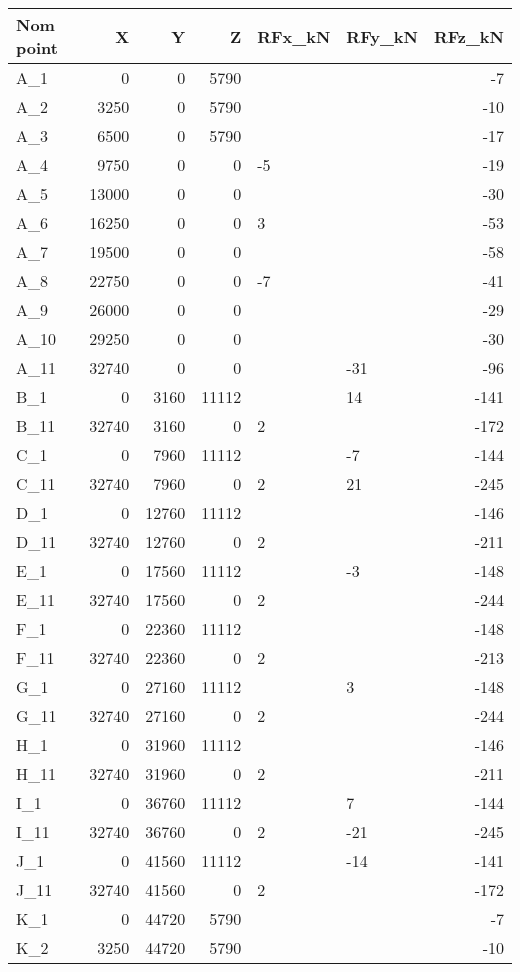 \begin{tabular}{lrrrllr}
\toprule
Nom point & X & Y & Z & RFx\_kN & RFy\_kN & RFz\_kN \\
\midrule
A\_1 & 0 & 0 & 5790 &  &  & -7 \\
A\_2 & 3250 & 0 & 5790 &  &  & -10 \\
A\_3 & 6500 & 0 & 5790 &  &  & -17 \\
A\_4 & 9750 & 0 & 0 & -5 &  & -19 \\
A\_5 & 13000 & 0 & 0 &  &  & -30 \\
A\_6 & 16250 & 0 & 0 & 3 &  & -53 \\
A\_7 & 19500 & 0 & 0 &  &  & -58 \\
A\_8 & 22750 & 0 & 0 & -7 &  & -41 \\
A\_9 & 26000 & 0 & 0 &  &  & -29 \\
A\_10 & 29250 & 0 & 0 &  &  & -30 \\
A\_11 & 32740 & 0 & 0 &  & -31 & -96 \\
B\_1 & 0 & 3160 & 11112 &  & 14 & -141 \\
B\_11 & 32740 & 3160 & 0 & 2 &  & -172 \\
C\_1 & 0 & 7960 & 11112 &  & -7 & -144 \\
C\_11 & 32740 & 7960 & 0 & 2 & 21 & -245 \\
D\_1 & 0 & 12760 & 11112 &  &  & -146 \\
D\_11 & 32740 & 12760 & 0 & 2 &  & -211 \\
E\_1 & 0 & 17560 & 11112 &  & -3 & -148 \\
E\_11 & 32740 & 17560 & 0 & 2 &  & -244 \\
F\_1 & 0 & 22360 & 11112 &  &  & -148 \\
F\_11 & 32740 & 22360 & 0 & 2 &  & -213 \\
G\_1 & 0 & 27160 & 11112 &  & 3 & -148 \\
G\_11 & 32740 & 27160 & 0 & 2 &  & -244 \\
H\_1 & 0 & 31960 & 11112 &  &  & -146 \\
H\_11 & 32740 & 31960 & 0 & 2 &  & -211 \\
I\_1 & 0 & 36760 & 11112 &  & 7 & -144 \\
I\_11 & 32740 & 36760 & 0 & 2 & -21 & -245 \\
J\_1 & 0 & 41560 & 11112 &  & -14 & -141 \\
J\_11 & 32740 & 41560 & 0 & 2 &  & -172 \\
K\_1 & 0 & 44720 & 5790 &  &  & -7 \\
K\_2 & 3250 & 44720 & 5790 &  &  & -10 \\

\end{tabular}
